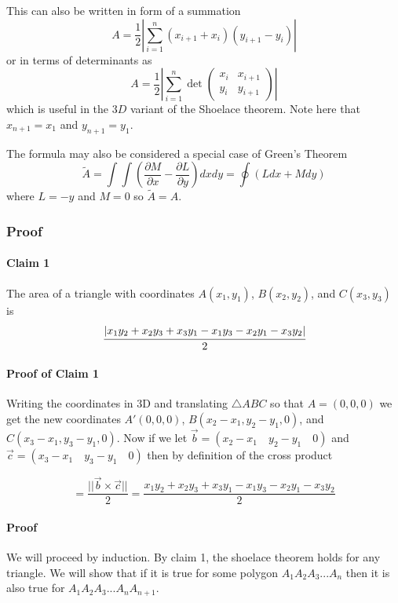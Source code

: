\documentclass[]{scrartcl}
\begin{document}
This can also be written in form of a summation
\begin{equation}
A = \dfrac{1}{2} \left|\sum_{i=1}^n{(x_{i+1}+x_i)(y_{i+1}-y_i)}\right|
\end{equation}
or in terms of determinants as
\begin{equation}
A = \dfrac{1}{2} \left|\sum_{i=1}^n{\det\begin{pmatrix}x_i&x_{i+1}\\y_i&y_{i+1}\end{pmatrix}}\right|
\end{equation}
which is useful in the $3D$ variant of the Shoelace theorem. Note here that $x_{n+1} = x_1$ and $y_{n+1} = y_1$.

The formula may also be considered a special case of Green's Theorem
\begin{equation}
\tilde{A}=\int \int \left(\frac{\partial M}{\partial x}-\frac{\partial L}{\partial y}\right)dxdy=\oint(Ldx+Mdy)
\end{equation}
where $L=-y$ and $M=0$ so $\tilde{A}=A$.

\subsubsection{Proof}
\paragraph{Claim 1} The area of a triangle with coordinates 
$A(x_1, y_1)$, $B(x_2, y_2)$, and $C(x_3, y_3)$ is
\begin{equation}
\cfrac{|x_1y_2+x_2y_3+x_3y_1-x_1y_3-x_2y_1-x_3y_2|}{2}
\end{equation}

\paragraph{Proof of Claim 1} Writing the coordinates in 3D and translating $\triangle ABC$ so that $A=(0, 0, 0)$ we get the new coordinates $A'(0, 0, 0)$, $B(x_2-x_1, y_2-y_1, 0)$, and $C(x_3-x_1, y_3-y_1, 0)$. Now if we let $\vec{b}=(x_2-x_1 \quad y_2-y_1 \quad 0)$ and $\vec{c}=(x_3-x_1 \quad y_3-y_1 \quad 0)$ then by definition of the cross product

\begin{equation}
[ABC]=\frac{||\vec{b} \times \vec{c}||}{2}=\frac{x_1y_2+x_2y_3+x_3y_1-x_1y_3-x_2y_1-x_3y_2}{2}
\end{equation}

\paragraph{Proof} We will proceed by induction. By claim 1, the shoelace theorem holds for any triangle. We will show that if it is true for some polygon $A_1A_2A_3...A_n$ then it is also true for $A_1A_2A_3...A_nA_{n+1}$.
\end{document}
